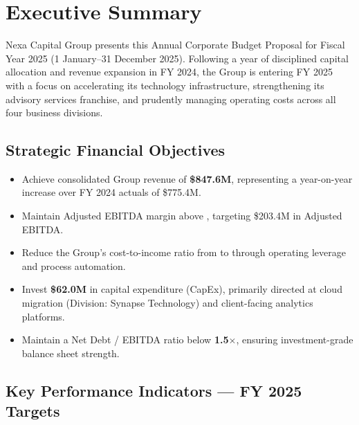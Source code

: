 
\section{Executive Summary}

Nexa Capital Group presents this Annual Corporate Budget Proposal for Fiscal Year 2025
(1 January–31 December 2025). Following a year of disciplined capital allocation and
revenue expansion in FY 2024, the Group is entering FY 2025 with a focus on
accelerating its technology infrastructure, strengthening its advisory services
franchise, and prudently managing operating costs across all four business divisions.

\subsection{Strategic Financial Objectives}

\begin{itemize}
  \item Achieve consolidated Group revenue of \textbf{\$847.6M}, representing a
         year-on-year increase over FY 2024 actuals of \$775.4M.
  \item Maintain Adjusted EBITDA margin above , targeting \$203.4M
        in Adjusted EBITDA.
  \item Reduce the Group's cost-to-income ratio from  to 
        through operating leverage and process automation.
  \item Invest \textbf{\$62.0M} in capital expenditure (CapEx), primarily directed
        at cloud migration (Division: Synapse Technology) and client-facing analytics
        platforms.
  \item Maintain a Net Debt / EBITDA ratio below \textbf{1.5$\times$}, ensuring
        investment-grade balance sheet strength.
\end{itemize}

\subsection{Key Performance Indicators — FY 2025 Targets}

\vspace{6pt}
\begin{minipage}[t]{0.23\textwidth}
\end{minipage}%
\hspace{0.02\textwidth}%
\begin{minipage}[t]{0.23\textwidth}
\end{minipage}%
\hspace{0.02\textwidth}%
\begin{minipage}[t]{0.23\textwidth}
\end{minipage}%
\hspace{0.02\textwidth}%
\begin{minipage}[t]{0.23\textwidth}
\end{minipage}
\par
\vspace{10pt}

